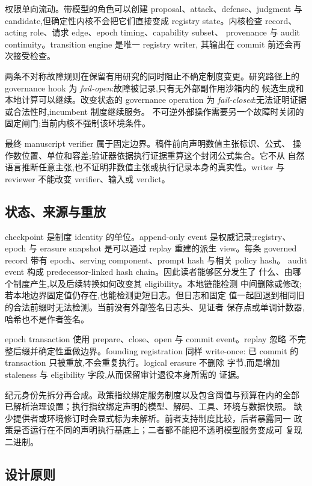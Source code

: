 权限单向流动。带模型的角色可以创建 proposal、attack、defense、judgment
与 candidate,但确定性内核不会把它们直接变成 registry state。内核检查
record、acting role、请求 edge、epoch timing、capability subset、
provenance 与 audit continuity。transition engine 是唯一 registry writer,
其输出在 commit 前还会再次接受检查。

两条不对称故障规则在保留有用研究的同时阻止不确定制度变更。研究路径上的
governance hook 为 \emph{fail-open}:故障被记录,只有无外部副作用沙箱内的
候选生成和本地计算可以继续。改变状态的 governance operation 为
\emph{fail-closed}:无法证明证据或合法性时,incumbent 制度继续服务。
不可逆外部操作需要另一个故障时关闭的固定闸门;当前内核不强制该环境条件。

最终 manuscript verifier 属于固定边界。稿件前向声明数值主张标识、公式、
操作数位置、单位和容差;验证器依据执行证据重算这个封闭公式集合。它不从
自然语言推断任意主张,也不证明非数值主张或执行记录本身的真实性。writer
与 reviewer 不能改变 verifier、输入或 verdict。

\subsection{状态、来源与重放}\label{sec:overview:checkpoint}

checkpoint 是制度 identity 的单位。append-only event 是权威记录;registry、
epoch 与 erasure snapshot 是可以通过 replay 重建的派生 view。每条 governed
record 带有 epoch、serving component、prompt hash 与相关 policy hash。
audit event 构成 predecessor-linked hash chain。因此读者能够区分发生了
什么、由哪个制度产生,以及后续转换如何改变其 eligibility。本地链能检测
中间删除或修改;若本地边界固定值仍存在,也能检测更短日志。但日志和固定
值一起回退到相同旧的合法前缀时无法检测。当前没有外部签名日志头、见证者
保存点或单调计数器,哈希也不是作者签名。

epoch transaction 使用 prepare、close、open 与 commit event。replay 忽略
不完整后缀并确定性重做边界。founding registration 同样 write-once:
已 commit 的 transaction 只被重放,不会重复执行。logical erasure 不删除
字节,而是增加 staleness 与 eligibility 字段,从而保留审计退役本身所需的
证据。

纪元身份先拆分再合成。政策指纹绑定服务制度以及包含阈值与预算在内的全部
已解析治理设置；执行指纹绑定声明的模型、解码、工具、环境与数据快照。
缺少提供者或环境修订时会显式标为未解析。前者支持制度比较，后者暴露同一
政策是否运行在不同的声明执行基底上；二者都不能把不透明模型服务变成可
复现二进制。

\subsection{设计原则}\label{sec:overview:principles}

